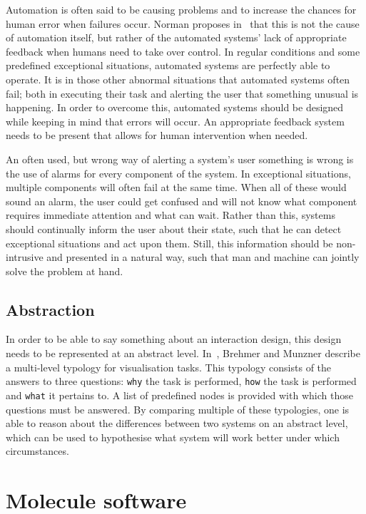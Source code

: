 Automation is often said to be causing problems and to increase the chances for human error when failures occur. Norman proposes in~\cite{norman1990problem} that this is not the cause of automation itself, but rather of the automated systems' lack of appropriate feedback when humans need to take over control. In regular conditions and some predefined exceptional situations, automated systems are perfectly able to operate. It is in those other abnormal situations that automated systems often fail; both in executing their task and alerting the user that something unusual is happening. In order to overcome this, automated systems should be designed while keeping in mind that errors will occur. An appropriate feedback system needs to be present that allows for human intervention when needed.

An often used, but wrong way of alerting a system's user something is wrong is the use of alarms for every component of the system. In exceptional situations, multiple components will often fail at the same time. When all of these would sound an alarm, the user could get confused and will not know what component requires immediate attention and what can wait. Rather than this, systems should continually inform the user about their state, such that he can detect exceptional situations and act upon them. Still, this information should be non-intrusive and presented in a natural way, such that man and machine can jointly solve the problem at hand.

\subsection{Abstraction}
In order to be able to say something about an interaction design, this design needs to be represented at an abstract level. In~\cite{brehmer2013multi}, Brehmer and Munzner describe a multi-level typology for visualisation tasks. This typology consists of the answers to three questions: \verb|why| the task is performed, \verb|how| the task is performed and \verb|what| it pertains to. A list of predefined nodes is provided with which those questions must be answered. By comparing multiple of these typologies, one is able to reason about the differences between two systems on an abstract level, which can be used to hypothesise what system will work better under which circumstances.


\section{Molecule software}

